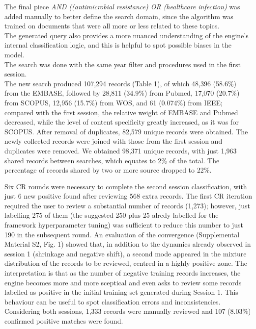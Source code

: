 \documentclass{article}
\begin{document}
The final piece \emph{AND ((antimicrobial resistance) OR (healthcare
infection)} was added manually to better define the search domain, since
the algorithm was trained on documents that were all more or less
related to these topics.\\
The generated query also provides a more nuanced understanding of the
engine's internal classification logic, and this is helpful to spot
possible biases in the model.\\

The search was done with the same year filter and procedures used in the
first session.\\

The new search produced 107,294 records (Table 1), of which 48,396
(58.6\%) from the EMBASE, followed by 28,811 (34.9\%) from Pubmed,
17,070 (20.7\%) from SCOPUS, 12,956 (15.7\%) from WOS, and 61 (0.074\%)
from IEEE; compared with the first session, the relative weight of
EMBASE and Pubmed decreased, while the level of content specificity
greatly increased, as it was for SCOPUS. After removal of duplicates,
82,579 unique records were obtained. The newly collected records were
joined with those from the first session and duplicates were removed. We
obtained 98,371 unique records, with just 1,963 shared records between
searches, which equates to 2\% of the total. The percentage of records
shared by two or more source dropped to 22\%.

Six CR rounds were necessary to complete the second session
classification, with just 6 new positive found after reviewing 568 extra
records. The first CR iteration required the user to review a
substantial number of records (1,273); however, just labelling 275 of
them (the suggested 250 plus 25 alredy labelled for the framework
hyperparameter tuning) was sufficient to reduce this number to just 190
in the subsequent round. An evaluation of the convergence (Supplemental
Material S2, Fig. 1) showed that, in addition to the dynamics already
observed in session 1 (shrinkage and negative shift), a second mode
appeared in the mixture distribution of the records to be reviewed,
centred in a highly positive zone. The interpretation is that as the
number of negative training records increases, the engine becomes more
and more sceptical and even asks to review some records labelled as
positive in the initial training set generated during Session 1. This
behaviour can be useful to spot classification errors and
inconsistencies. Considering both sessions, 1,333 records were manually
reviewed and 107 (8.03\%) confirmed positive matches were found.
\end{document}
